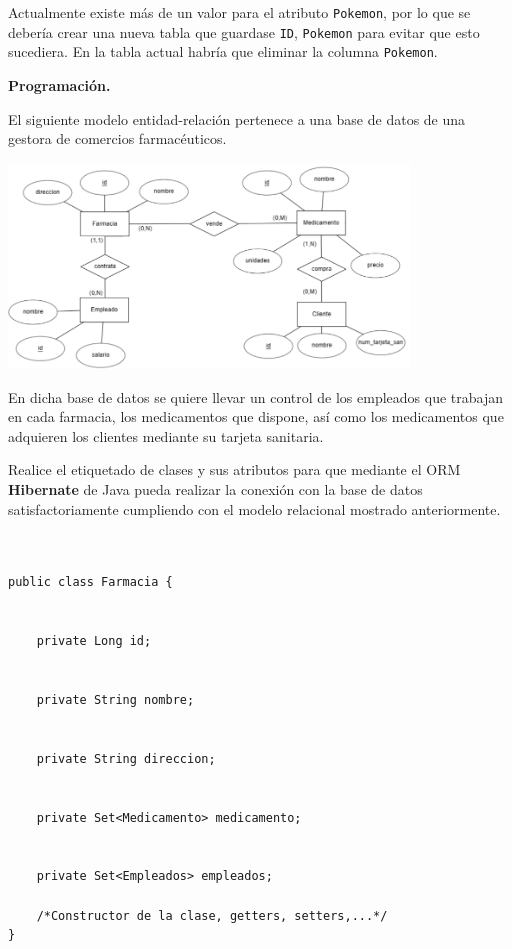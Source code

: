 \documentclass[
    12pt,
    a4paper,
    addpoints,
    answers,
    convocatoria=ord,
    titulacion=NoCD,
    curso=2023/2024,
]{db-exam}
\begin{document}
\begin{questions}
\begin{solution}
Actualmente existe más de un valor para el atributo \texttt{Pokemon}, por lo que se debería crear una nueva tabla que guardase \texttt{ID}, \texttt{Pokemon} para evitar que esto sucediera. En la tabla actual habría que eliminar la columna \texttt{Pokemon}.
\end{solution}

\newpage
\question[1] \textbf{Programación.}

El siguiente modelo entidad-relación pertenece a una base de datos de una gestora de comercios farmacéuticos.

\begin{center}
\includegraphics[width=0.8\textwidth]{figs/bbdd-2023-2024-ordinaria/mer-programacion.png}
\end{center}

En dicha base de datos se quiere llevar un control de los empleados que trabajan en cada farmacia, los medicamentos que dispone, así como los medicamentos que adquieren los clientes mediante su tarjeta sanitaria.

Realice el etiquetado de clases y sus atributos para que mediante el ORM \textbf{Hibernate} de Java pueda realizar la conexión con la base de datos satisfactoriamente cumpliendo con el modelo relacional mostrado anteriormente.
  
\begin{verbatim}

            
public class Farmacia {
    

    private Long id;


    private String nombre;

    
    private String direccion;


    private Set<Medicamento> medicamento;


    private Set<Empleados> empleados;

    /*Constructor de la clase, getters, setters,...*/
}



\end{verbatim}
\end{questions}
\end{document}
